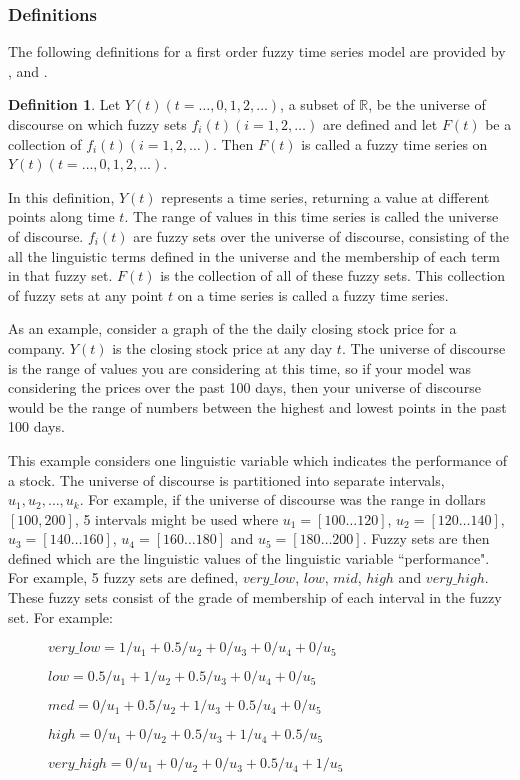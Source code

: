 \documentclass{article}
\theoremstyle{definition}
\newtheorem{ftsdef}{Definition}
\begin{document}
\subsubsection{Definitions}

The following definitions for a first order fuzzy time series model are provided by \cite{chen1996forecasting}, \cite{chen1996forecasting} and \cite{chu2009fuzzy}.

\begin{ftsdef}
Let $Y(t)(t= \ldots,0,1,2, \ldots)$, a subset of $\mathbb{R}$, be the universe of discourse on which fuzzy sets $f_i(t)(i=1,2,\ldots)$ are defined and let $F(t)$ be a collection of $f_i(t)(i=1,2,\ldots)$. Then $F(t)$ is called a fuzzy time series on $Y(t)(t= \ldots,0,1,2, \ldots)$.
\end{ftsdef}
In this definition, $Y(t)$ represents a time series, returning a value at different points along time $t$. The range of values in this time series is called the universe of discourse. $f_i(t)$ are fuzzy sets over the universe of discourse, consisting of the all the linguistic terms defined in the universe and the membership of each term in that fuzzy set. $F(t)$ is the collection of all of these fuzzy sets. This collection of fuzzy sets at any point $t$ on a time series is called a fuzzy time series.

As an example, consider a graph of the the daily closing stock price for a company. $Y(t)$ is the closing stock price at any day $t$. The universe of discourse is the range of values you are considering at this time, so if your model was considering the prices over the past 100 days, then your universe of discourse would be the range of numbers between the highest and lowest points in the past 100 days. 

This example considers one linguistic variable which indicates the performance of a stock. The universe of discourse is partitioned into separate intervals, $u_1, u_2,\ldots,u_k$. For example, if the universe of discourse was the range in dollars $[100, 200]$, 5 intervals might be used where $u_1 = [100 \ldots 120]$, $u_2 = [120 \ldots 140]$, $u_3 = [140 \ldots 160]$, $u_4 = [160 \ldots 180]$ and $u_5 = [180 \ldots 200]$. Fuzzy sets are then defined which are the linguistic values of the linguistic variable ``performance". For example, 5 fuzzy sets are defined, $very\_low$, $low$, $mid$, $high$ and $very\_high$. These fuzzy sets consist of the grade of membership of each interval in the fuzzy set. For example:
\begin{description}
\item[] $very\_low = 1/u_1 + 0.5/u_2 + 0/u_3 + 0/u_4 + 0/u_5$
\item[] $low = 0.5/u_1 + 1/u_2 + 0.5/u_3 + 0/u_4 + 0/u_5$
\item[] $med = 0/u_1 + 0.5/u_2 + 1/u_3 + 0.5/u_4 + 0/u_5$
\item[] $high = 0/u_1 + 0/u_2 + 0.5/u_3 + 1/u_4 + 0.5/u_5$
\item[] $very\_high = 0/u_1 + 0/u_2 + 0/u_3 + 0.5/u_4 + 1/u_5$
\end{description}
\end{document}
